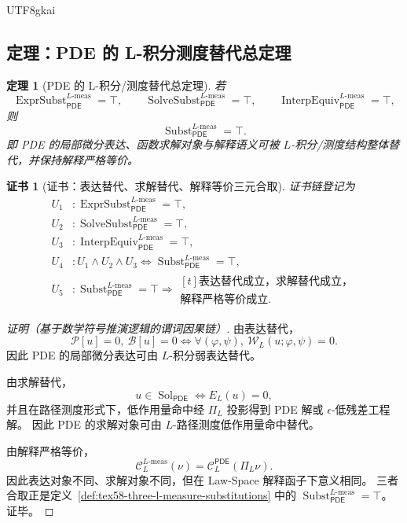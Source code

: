 \documentclass[12pt]{article}
\newtheorem{theorem}{定理}[section]
\newtheorem{Certificate}{证书}[section]
\newcommand{\Pcal}{\mathcal P}
\newcommand{\Bcal}{\mathcal B}
\newcommand{\PDE}{\ensuremath{\mathsf{PDE}}}
\DeclareMathOperator{\Sol}{Sol}
\DeclareMathOperator{\Subst}{Subst}
\DeclareMathOperator{\ExprSubst}{ExprSubst}
\DeclareMathOperator{\SolveSubst}{SolveSubst}
\DeclareMathOperator{\InterpEquiv}{InterpEquiv}
\newcommand{\Lmeas}{L\text{-}\mathrm{meas}}
\begin{document}
\begin{CJK*}{UTF8}{gkai}
\subsection{定理：PDE 的 L-积分测度替代总定理}
\label{subsec:tex58-total-l-measure-substitution}

\begin{theorem}[PDE 的 L-积分/测度替代总定理]
\label{thm:tex58-total-l-measure-substitution}
若
\[
  \ExprSubst_{\PDE}^{\Lmeas}=\top,
  \qquad
  \SolveSubst_{\PDE}^{\Lmeas}=\top,
  \qquad
  \InterpEquiv_{\PDE}^{\Lmeas}=\top,
\]
则
\[
  \Subst_{\PDE}^{\Lmeas}=\top.
\]
即 PDE 的局部微分表达、函数求解对象与解释语义可被 \(L\)-积分/测度结构整体替代，并保持解释严格等价。
\end{theorem}

\begin{Certificate}[证书：表达替代、求解替代、解释等价三元合取]
\label{cert:tex58-total-l-measure-substitution}
证书链登记为
\[
\begin{aligned}
  U_1 &: \ExprSubst_{\PDE}^{\Lmeas}=\top,\\
  U_2 &: \SolveSubst_{\PDE}^{\Lmeas}=\top,\\
  U_3 &: \InterpEquiv_{\PDE}^{\Lmeas}=\top,\\
  U_4 &: U_1\wedge U_2\wedge U_3
  \Longleftrightarrow
  \Subst_{\PDE}^{\Lmeas}=\top,\\
  U_5 &: \Subst_{\PDE}^{\Lmeas}=\top
  \Rightarrow
  \begin{gathered}[t]
  \text{表达替代成立，求解替代成立，}\\
  \text{解释严格等价成立}.
  \end{gathered}
\end{aligned}
\]
\end{Certificate}

\begin{proof}[证明（基于数学符号推演逻辑的谓词因果链）]
由表达替代，
\[
  \Pcal[u]=0,\ \Bcal[u]=0
  \Longleftrightarrow
  \forall(\varphi,\psi),\ \mathcal W_L(u;\varphi,\psi)=0.
\]
因此 PDE 的局部微分表达可由 \(L\)-积分弱表达替代。

由求解替代，
\[
  u\in\Sol_{\PDE}
  \Longleftrightarrow
  E_L(u)=0,
\]
并且在路径测度形式下，低作用量命中经 \(\Pi_L\) 投影得到 PDE 解或 \(\epsilon\)-低残差工程解。
因此 PDE 的求解对象可由 \(L\)-路径测度低作用量命中替代。

由解释严格等价，
\[
  \mathcal C_L^{\Lmeas}(\nu)
  =
  \mathcal C_L^{\PDE}(\Pi_L\nu).
\]
因此表达对象不同、求解对象不同，但在 Law-Space 解释函子下意义相同。
三者合取正是定义~\ref{def:tex58-three-l-measure-substitutions} 中的
\(\Subst_{\PDE}^{\Lmeas}=\top\)。证毕。
\end{proof}


\end{CJK*}
\end{document}
